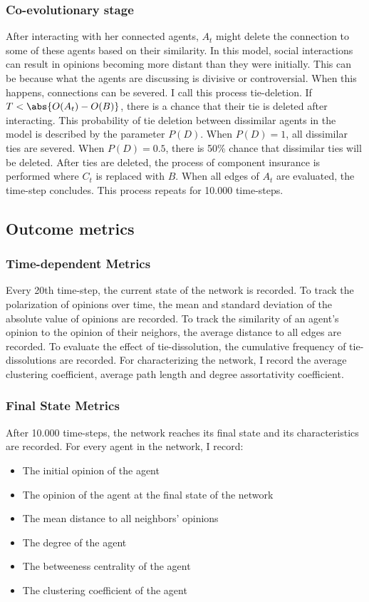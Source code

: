 \documentclass{article}
\DeclarePairedDelimiter{\abs}\lvert\rvert
\begin{document}
\subsubsection{Co-evolutionary stage}
After interacting with her connected agents, $A_t$ might delete the connection to some of these agents based on their similarity.
In this model, social interactions can result in opinions becoming more distant than they were initially. 
This can be because what the agents are discussing is divisive or controversial. When this happens, connections can be severed.
I call this process tie-deletion. 
If $T < \abs{O(A_t) - O(B)}$, there is a chance that their tie is deleted after interacting. This probability of tie deletion between dissimilar agents in the model is described by the parameter $P(D)$.
When $P(D) = 1$, all dissimilar ties are severed. When $P(D) = 0.5$, there is 50\% chance that dissimilar ties will be deleted. 
After ties are deleted, the process of component insurance is performed where $C_t$ is replaced with $B$.
When all edges of $A_t$ are evaluated, the time-step concludes. This process repeats for 10.000 time-steps.

\subsection{Outcome metrics} 

\subsubsection{Time-dependent Metrics}
Every 20th time-step, the current state of the network is recorded. 
To track the polarization of opinions over time,
the mean and standard deviation of the absolute value of opinions are recorded.
To track the similarity of an agent's opinion to the opinion of their neighors, the average distance to all edges are recorded.
To evaluate the effect of tie-dissolution, the cumulative frequency of tie-dissolutions are recorded.
For characterizing the network, I record the average clustering coefficient, average path length and degree assortativity coefficient.

\subsubsection{Final State Metrics}
After 10.000 time-steps, the network reaches its final state and its characteristics are recorded. 
For every agent in the network, I record: 
\begin{itemize}
    \item The initial opinion of the agent
    \item The opinion of the agent at the final state of the network
    \item The mean distance to all neighbors' opinions
    \item The degree of the agent 
    \item The betweeness centrality of the agent 
    \item The clustering coefficient of the agent 
\end{itemize}
\end{document}
